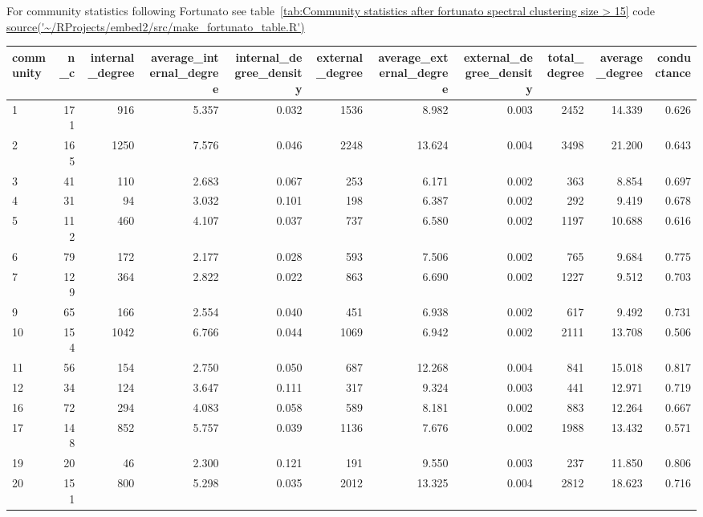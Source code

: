 For community statistics following Fortunato \cite{fortunato2016community} see table~\ref{tab:Community statistics after fortunato spectral clustering size > 15} 
code \url{source('~/RProjects/embed2/src/make_fortunato_table.R')}
\begin{table}[ht]
\centering
\begin{adjustbox}{max width=\textwidth}
\begin{tabular}{lrrrrrrrrrr}
  \hline
community & n\_c & internal\_degree & average\_internal\_degree & internal\_degree\_density & external\_degree & average\_external\_degree & external\_degree\_density & total\_degree & average\_degree & conductance \\ 
  \hline
1 & 171 & 916 & 5.357 & 0.032 & 1536 & 8.982 & 0.003 & 2452 & 14.339 & 0.626 \\ 
  2 & 165 & 1250 & 7.576 & 0.046 & 2248 & 13.624 & 0.004 & 3498 & 21.200 & 0.643 \\ 
  3 & 41 & 110 & 2.683 & 0.067 & 253 & 6.171 & 0.002 & 363 & 8.854 & 0.697 \\ 
  4 & 31 & 94 & 3.032 & 0.101 & 198 & 6.387 & 0.002 & 292 & 9.419 & 0.678 \\ 
  5 & 112 & 460 & 4.107 & 0.037 & 737 & 6.580 & 0.002 & 1197 & 10.688 & 0.616 \\ 
  6 & 79 & 172 & 2.177 & 0.028 & 593 & 7.506 & 0.002 & 765 & 9.684 & 0.775 \\ 
  7 & 129 & 364 & 2.822 & 0.022 & 863 & 6.690 & 0.002 & 1227 & 9.512 & 0.703 \\ 
  9 & 65 & 166 & 2.554 & 0.040 & 451 & 6.938 & 0.002 & 617 & 9.492 & 0.731 \\ 
  10 & 154 & 1042 & 6.766 & 0.044 & 1069 & 6.942 & 0.002 & 2111 & 13.708 & 0.506 \\ 
  11 & 56 & 154 & 2.750 & 0.050 & 687 & 12.268 & 0.004 & 841 & 15.018 & 0.817 \\ 
  12 & 34 & 124 & 3.647 & 0.111 & 317 & 9.324 & 0.003 & 441 & 12.971 & 0.719 \\ 
  16 & 72 & 294 & 4.083 & 0.058 & 589 & 8.181 & 0.002 & 883 & 12.264 & 0.667 \\ 
  17 & 148 & 852 & 5.757 & 0.039 & 1136 & 7.676 & 0.002 & 1988 & 13.432 & 0.571 \\ 
  19 & 20 & 46 & 2.300 & 0.121 & 191 & 9.550 & 0.003 & 237 & 11.850 & 0.806 \\ 
  20 & 151 & 800 & 5.298 & 0.035 & 2012 & 13.325 & 0.004 & 2812 & 18.623 & 0.716 \\ 

\end{tabular}
\end{adjustbox}
\end{table}
